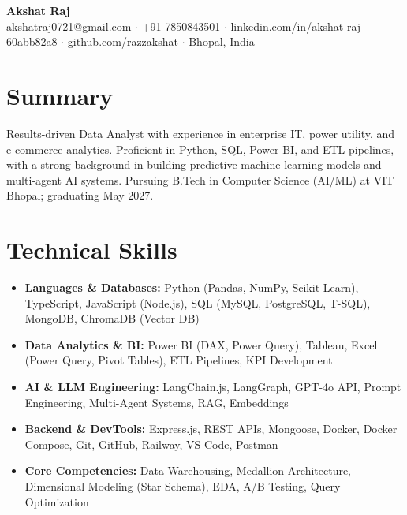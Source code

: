 \documentclass[10pt,letterpaper]{article}
\begin{document}
\begin{center}
  {\LARGE\bfseries Akshat Raj}\\[3pt]
  {\small
    \href{mailto:akshatraj0721@gmail.com}{akshatraj0721@gmail.com} \;$\cdot$\;
    +91-7850843501 \;$\cdot$\;
    \href{https://linkedin.com/in/akshat-raj-60abb82a8}{linkedin.com/in/akshat-raj-60abb82a8} \;$\cdot$\;
    \href{https://github.com/razzakshat}{github.com/razzakshat} \;$\cdot$\;
    Bhopal, India
  }
\end{center}

\vspace{1pt}

\section{Summary}
Results-driven Data Analyst with experience in enterprise IT, power utility, and e-commerce analytics. Proficient in Python, SQL, Power BI, and ETL pipelines, with a strong background in building predictive machine learning models and multi-agent AI systems. Pursuing B.Tech in Computer Science (AI/ML) at VIT Bhopal; graduating May 2027.

\vspace{3pt}

\section{Technical Skills}
\begin{itemize}[leftmargin=0.15in, label={}, itemsep=1pt, topsep=1pt]
  \item \textbf{Languages \& Databases:} Python (Pandas, NumPy, Scikit-Learn), TypeScript, JavaScript (Node.js), SQL (MySQL, PostgreSQL, T-SQL), MongoDB, ChromaDB (Vector DB)
  \item \textbf{Data Analytics \& BI:} Power BI (DAX, Power Query), Tableau, Excel (Power Query, Pivot Tables), ETL Pipelines, KPI Development
  \item \textbf{AI \& LLM Engineering:} LangChain.js, LangGraph, GPT-4o API, Prompt Engineering, Multi-Agent Systems, RAG, Embeddings
  \item \textbf{Backend \& DevTools:} Express.js, REST APIs, Mongoose, Docker, Docker Compose, Git, GitHub, Railway, VS Code, Postman
  \item \textbf{Core Competencies:} Data Warehousing, Medallion Architecture, Dimensional Modeling (Star Schema), EDA, A/B Testing, Query Optimization
\end{itemize}
\end{document}
